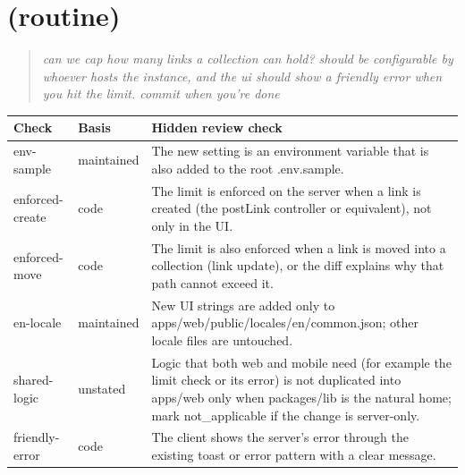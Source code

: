 \section{ (routine)}
\begin{quote}\small\itshape can we cap how many links a collection can hold? should be configurable by whoever hosts the instance, and the ui should show a friendly error when you hit the limit. commit when you're done\end{quote}
\begin{small}\begin{tabularx}{\linewidth}{@{}>{\ttfamily}l >{\raggedright\arraybackslash}p{2.2cm} >{\raggedright\arraybackslash}X@{}}
\toprule \normalfont Check & Basis & Hidden review check \\ \midrule
env-sample & maintained & The new setting is an environment variable that is also added to the root .env.sample. \\
enforced-create & code & The limit is enforced on the server when a link is created (the postLink controller or equivalent), not only in the UI. \\
enforced-move & code & The limit is also enforced when a link is moved into a collection (link update), or the diff explains why that path cannot exceed it. \\
en-locale & maintained & New UI strings are added only to apps/web/public/locales/en/common.json; other locale files are untouched. \\
shared-logic & unstated & Logic that both web and mobile need (for example the limit check or its error) is not duplicated into apps/web only when packages/lib is the natural home; mark not\_applicable if the change is server-only. \\
friendly-error & code & The client shows the server's error through the existing toast or error pattern with a clear message. \\
\bottomrule\end{tabularx}\end{small}
